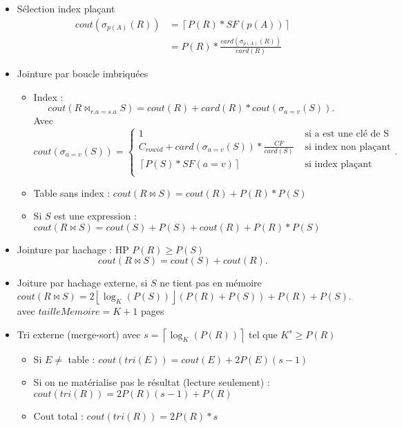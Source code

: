 \documentclass{article}
\theoremstyle{plain}%
\theoremstyle{definition}
\theoremstyle{remark}
\begin{document}
\begin{itemize}
    \item Sélection index plaçant \begin{align*}
        cout(\sigma _{p(A)}(R)) &= \left\lceil P(R) * SF(p(A))\right\rceil \\
            &= P(R) * \frac{card(\sigma _{p(A)}(R))}{card(R)}
    \end{align*}
    \item Jointure par boucle imbriquées \begin{itemize}
        \item Index : 
        \[
            cout(R \bowtie _{r.a = s.a} S) = cout(R) + card(R) * cout(\sigma _{a=v} (S))
        .\]
        Avec 
        \[
            cout(\sigma _{a=v} (S)) = \begin{cases}
            1 &\text{ si a est une clé de S}\\
            C_{rowid} + card(\sigma _{a=v}(S)) * \frac{CF}{card(S)} &\text{ si index non plaçant}\\
            \left\lceil P(S) * SF(a=v) \right\rceil  &\text{ si index plaçant}\\
            \end{cases} 
        .\]
        \item Table sans index : $ cout(R \bowtie S) = cout(R) + P(R)* P(S) $ 
        \item Si $ S $ est une expression : $ cout(R \bowtie S) = cout(S) + P(S) + cout(R) + P(R)*P(S) $
    \end{itemize}
    
    \item Jointure par hachage : HP $ P(R) \geq P(S) $
    \[
        cout(R \bowtie S) = cout(S) + cout(R)
    .\]
    \item Joiture par hachage externe, si $ S $ ne tient pas en mémoire 
    \[
        cout(R \bowtie S) = 2 \left\lfloor \log_{K}(P(S)) \right\rfloor (P(R) + P(S)) + P(R) + P(S)
    .\]
    avec $ tailleMemoire = K + 1 $ pages 
    \item Tri externe (merge-sort) avec $ s = \left\lceil \log_{K} (P(R)) \right\rceil  $ tel que $ K^s \geq P(R) $  \begin{itemize}
        \item Si $ E \neq  $ table : $ cout(tri(E)) = cout(E) + 2P(E)(s-1) $ 
        \item Si on ne matérialise pas le résultat (lecture seulement) : $ cout(tri(R)) = 2 P(R)(s-1) + P(R) $ 
        \item Cout total : $ cout(tri(R)) = 2 P(R) * s$ 
    \end{itemize}
    

\end{itemize}
\end{document}
